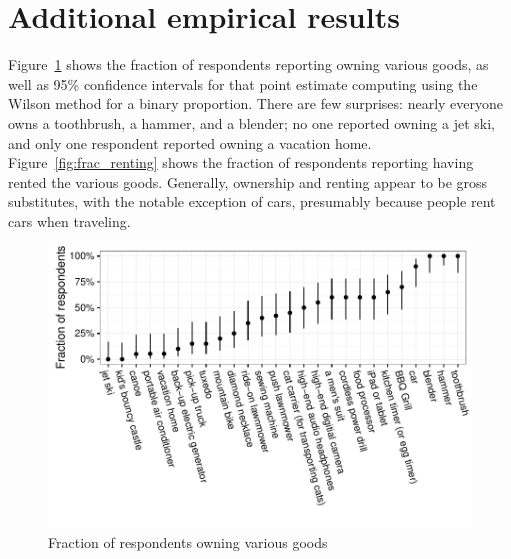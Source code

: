 \documentclass[12pt]{article}
\begin{document}
\section{Additional empirical results} \label{sec:additional_results}

Figure~\ref{fig:frac_owning} shows the fraction of respondents reporting owning various goods, as well as 95\% confidence intervals for that point estimate computing using the Wilson method for a binary proportion.    
There are few surprises: nearly everyone owns a toothbrush, a hammer, and a blender; no one reported owning a jet ski, and only one respondent reported owning a vacation home.
Figure~\ref{fig:frac_renting} shows the fraction of respondents reporting having rented the various goods. 
Generally, ownership and renting appear to be gross substitutes, with the notable exception of cars, presumably because people rent cars when traveling.

\begin{figure}
\centering 
\caption{Fraction of respondents owning various goods \label{fig:frac_owning} }
\begin{minipage}{0.90 \linewidth}
\includegraphics[width = \linewidth]{./plots/ownership_fractions.pdf} 
\end{minipage} 
\end{figure} 
\end{document}
